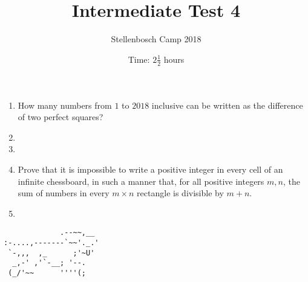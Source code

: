 \documentclass{article}
\title{Intermediate Test 4}
\author{Stellenbosch Camp 2018}
\date{Time: $2\frac{1}{2}$ hours}
\begin{document}
\maketitle

\begin{enumerate}[1.]

\item %
How many numbers from $1$ to $2018$ inclusive can be written as the difference of two perfect squares?


\vspace{12pt}
\item %


\vspace{12pt}
\item %


\vspace{12pt}
\item %
Prove that it is impossible to write a positive integer in every cell of an infinite chessboard, in such a manner that, for all positive integers $m, n$, the sum of numbers in every $m\times n$ rectangle is divisible by $m + n$.


\vspace{12pt}
\item %


\end{enumerate}


\vfill
\centering
\begin{BVerbatim}
             .--~~,__
:-....,-------`~~'._.'
 `-,,,  ,_      ;'~U'
  _,-' ,'`-__; '--.
 (_/'~~      ''''(;
\end{BVerbatim}
\end{document}
